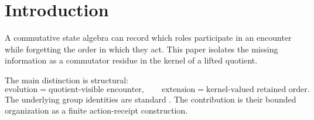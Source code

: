\section{Introduction}

A commutative state algebra can record which roles participate in an
encounter while forgetting the order in which they act. This paper
isolates the missing information as a commutator residue in the kernel
of a lifted quotient.

The main distinction is structural:
\[
\text{evolution}=\text{quotient-visible encounter},
\qquad
\text{extension}=\text{kernel-valued retained order}.
\]
The underlying group identities are standard
\cite{dummit-foote,rotman}. The contribution is their bounded
organization as a finite action-receipt construction.
